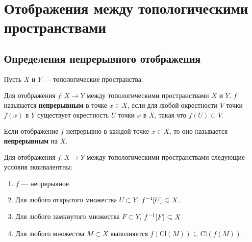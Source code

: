 
\section{Отображения между топологическими пространствами}
\subsection{Определения непрерывного отображения}
Пусть \( X \) и \( Y \) — топологические пространства. 

\begin{definition}
	Для отображения \( f : X \rightarrow Y \) между топологическими пространствами \( X \) и \( Y \), \( f \) называется \textbf{непрерывным} в точке \( x \in X \), если для любой окрестности \( V \) точки \( f(x) \) в \( Y \) существует окрестность \( U \) точки \( x \) в \( X \), такая что \( f(U) \subset V \). 

	Если отображение \( f \) непрерывно в каждой точке \( x \in X \), то оно называется \textbf{непрерывным} на \( X \).
\end{definition}

\begin{statement}
	Для отображения \( f : X \rightarrow Y \) между топологическими пространствами следующие условия эквивалентны:
	\begin{enumerate}
		\item \(f\) — непрерывное.
		\item Для любого открытого множества \( U \subset Y \), \( f^{-1}[U] \open X \).
		\item Для любого замкнутого множества \( F \subset Y \), \( f^{-1}[F]\closed X \).
		\item Для любого множества \( M \subset X \) выполняется \( f(\mathrm{Cl}(M)) \subseteq \mathrm{Cl}(f(M)) \).
	\end{enumerate}
\end{statement}

